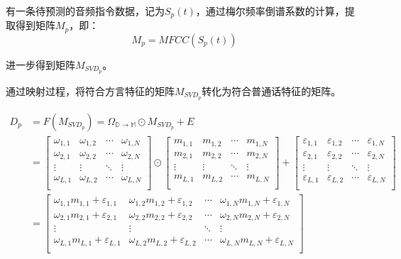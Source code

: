\documentclass[lang=cn,cite=super]{elegantpaper}
\begin{document}
有一条待预测的音频指令数据，记为$S_p(t)$，通过梅尔频率倒谱系数的计算，提取得到矩阵$M_p$，即：
\begin{equation}
    M_p = MFCC(S_p(t))
\end{equation}

进一步得到矩阵$M_{SVD_p}$。

通过映射过程，将符合方言特征的矩阵$M_{SVD_p}$转化为符合普通话特征的矩阵。

\begin{align}
    D_p &= F(M_{SVD_p}) = \Omega_{\mathbb{D}\rightarrow  \mathbb{M}} \odot M_{SVD_p} + E  \\
    &= \begin{bmatrix}
        \omega_{1,1} & \omega_{1,2} & \cdots & \omega_{1,N} \\
        \omega_{2,1} & \omega_{2,2} & \cdots & \omega_{2,N} \\
        \vdots & \vdots & \ddots & \vdots \\
        \omega_{L,1} & \omega_{L,2} & \cdots & \omega_{L,N}\\
    \end{bmatrix} \odot \begin{bmatrix}
        m_{1,1} & m_{1,2} & \cdots & m_{1,N} \\
        m_{2,1} & m_{2,2} & \cdots & m_{2,N} \\
        \vdots & \vdots & \ddots & \vdots \\
        m_{L,1} & m_{L,2} & \cdots & m_{L,N}\\
    \end{bmatrix} + \begin{bmatrix}
        \varepsilon_{1,1} & \varepsilon_{1,2} & \cdots & \varepsilon_{1,N} \\
        \varepsilon_{2,1} & \varepsilon_{2,2} & \cdots & \varepsilon_{2,N} \\
        \vdots & \vdots & \ddots & \vdots \\
        \varepsilon_{L,1} & \varepsilon_{L,2} & \cdots & \varepsilon_{L,N}\\
    \end{bmatrix}\\
    &= \begin{bmatrix}
        \omega_{1,1}m_{1,1}+\varepsilon_{1,1} & \omega_{1,2}m_{1,2}+\varepsilon_{1,2} & \cdots & \omega_{1,N}m_{1,N}+\varepsilon_{1,N} \\
        \omega_{2,1}m_{2,1}+\varepsilon_{2,1} & \omega_{2,2}m_{2,2}+\varepsilon_{2,2} & \cdots & \omega_{2,N}m_{2,N}+\varepsilon_{2,N} \\
        \vdots & \vdots & \ddots & \vdots \\
        \omega_{L,1}m_{L,1}+\varepsilon_{L,1} & \omega_{L,2}m_{L,2}+\varepsilon_{L,2} & \cdots & \omega_{L,N}m_{L,N}+\varepsilon_{L,N}\\
    \end{bmatrix}
\end{align}
\end{document}

